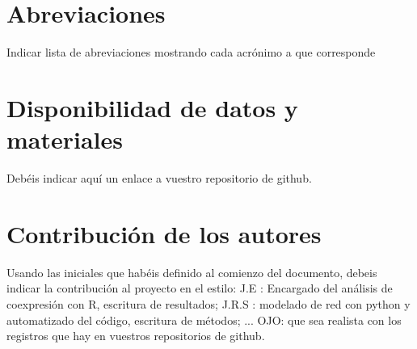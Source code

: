 \documentclass{bmcart}
\begin{document}
	\begin{backmatter}
	
		\section*{Abreviaciones}%
			Indicar lista de abreviaciones mostrando cada acrónimo a que corresponde
		
		\section*{Disponibilidad de datos y materiales}%
			Debéis indicar aquí un enlace a vuestro repositorio de github.
		
		\section*{Contribución de los autores}
			Usando las iniciales que habéis definido al comienzo del documento, debeis indicar la contribución al proyecto en el estilo:
			J.E : Encargado del análisis de coexpresión con R, escritura de resultados; J.R.S : modelado de red con python y automatizado del código, escritura de métodos; ...
			OJO: que sea realista con los registros que hay en vuestros repositorios de github. 
		
		
		
	
	\end{backmatter}
\end{document}
